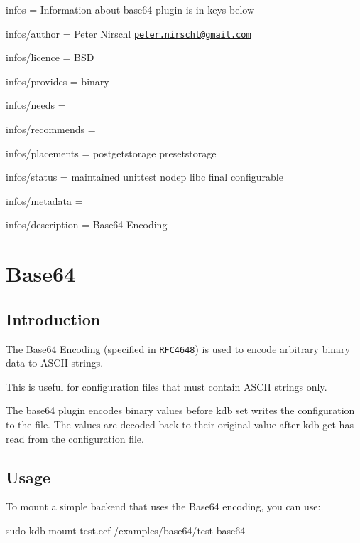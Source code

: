 
\begin{DoxyItemize}
\item infos = Information about base64 plugin is in keys below
\item infos/author = Peter Nirschl \href{mailto:peter.nirschl@gmail.com}{\tt peter.\+nirschl@gmail.\+com}
\item infos/licence = B\+SD
\item infos/provides = binary
\item infos/needs =
\item infos/recommends =
\item infos/placements = postgetstorage presetstorage
\item infos/status = maintained unittest nodep libc final configurable
\item infos/metadata =
\item infos/description = Base64 Encoding
\end{DoxyItemize}\hypertarget{md_src_plugins_base64_README_src_plugins_base64_README_md}{}\section{Base64}\label{md_src_plugins_base64_README_src_plugins_base64_README_md}
\subsection*{Introduction}

The Base64 Encoding (specified in \href{https://www.ietf.org/rfc/rfc4648.txt}{\tt R\+F\+C4648}) is used to encode arbitrary binary data to A\+S\+C\+II strings.

This is useful for configuration files that must contain A\+S\+C\+II strings only.

The {\ttfamily base64} plugin encodes binary values before {\ttfamily kdb set} writes the configuration to the file. The values are decoded back to their original value after {\ttfamily kdb get} has read from the configuration file.

\subsection*{Usage}

To mount a simple backend that uses the Base64 encoding, you can use\+:


\begin{DoxyCode}
sudo kdb mount test.ecf /examples/base64/test base64
\end{DoxyCode}


